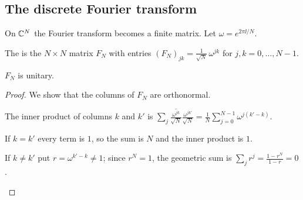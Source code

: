 \subsection{The discrete Fourier transform}

On $\mathbb{C}^N$ the Fourier transform becomes a finite matrix. Let $\omega=e^{2\pi\ii/N}$.

\begin{definition}\label{def:dft}
  The  is the $N\times N$ matrix $F_N$ with entries $(F_N)_{jk}=\frac1{\sqrt N}\,\omega^{jk}$ for $j,k=0,\dots,N-1$.
\end{definition}

\begin{theorem}\label{thm:dft-unitary}
  $F_N$ is unitary.
\end{theorem}
\begin{proof}
  We show that the columns of $F_N$ are orthonormal.
  \begin{steps}
    \item The inner product of columns $k$ and $k'$ is $\sum_j\overline{\tfrac{\omega^{jk}}{\sqrt N}}\tfrac{\omega^{jk'}}{\sqrt N}=\frac1N\sum_{j=0}^{N-1}\omega^{j(k'-k)}$.
    \item If $k=k'$ every term is $1$, so the sum is $N$ and the inner product is $1$.
    \item If $k\neq k'$ put $r=\omega^{k'-k}\neq1$; since $r^N=1$, the geometric sum is $\sum_jr^j=\frac{1-r^N}{1-r}=0$. \qedhere
  \end{steps}
\end{proof}

